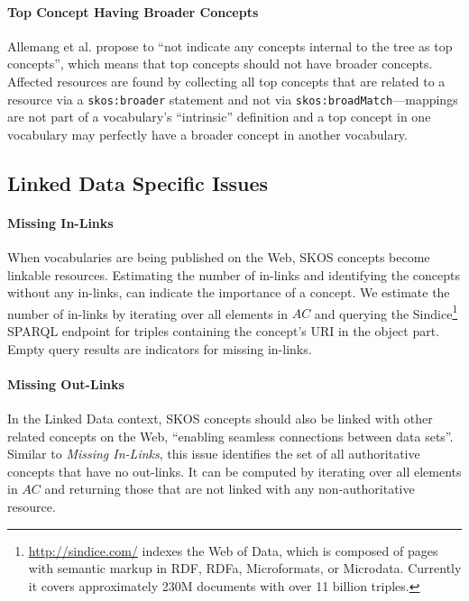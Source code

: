 \paragraph{Top Concept Having Broader Concepts}

Allemang et al. \cite{Allemang2011} propose to ``not indicate any concepts internal to the tree as top concepts'', which means that top concepts should not have broader concepts. 
Affected resources are found by collecting all top concepts that are related to a resource via a \texttt{skos:broader} statement and not via \texttt{skos:broadMatch}---mappings are not part of a vocabulary's ``intrinsic'' definition and a top concept in one vocabulary may perfectly have a broader concept in another vocabulary.


\subsection{Linked Data Specific Issues}\label{subsec:ld_issues}

\paragraph{Missing In-Links}

When vocabularies are being published on the Web, SKOS concepts become linkable resources. Estimating the number of in-links and identifying the concepts without any in-links, can indicate the importance of a concept.
We estimate the number of in-links by iterating over all elements in $AC$ and querying the Sindice\footnote{\url{http://sindice.com/} indexes the Web of Data, which is composed of pages with semantic markup in RDF, RDFa, Microformats, or Microdata. Currently it covers approximately 230M documents with over 11 billion triples.} SPARQL endpoint for triples containing the concept's URI in the object part. Empty query results are indicators for missing in-links.

\paragraph{Missing Out-Links}

In the Linked Data context, SKOS concepts should also be linked with other related concepts on the Web, ``enabling seamless connections between data sets''\cite{Heath2011}. Similar to \emph{Missing In-Links}, this issue identifies the set of all authoritative concepts that have no out-links.
It can be computed by iterating over all elements in $AC$ and returning those that are not linked with any non-authoritative resource.

